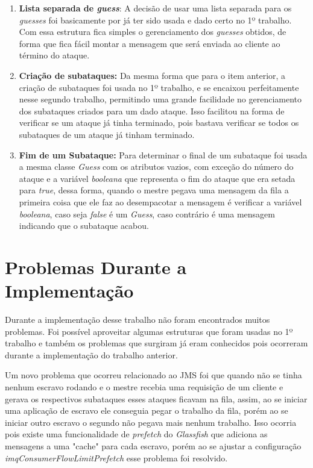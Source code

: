 \documentclass[
	12pt,				%
    oneside,			%
	a4paper,			%
	english,			%
	brazil,				%
	]{abntex2}
\begin{document}
\begin{enumerate}

	\item \textbf{Lista separada de \textit{guess}}: A decisão de usar uma lista separada para os \textit{guesses} foi 
	basicamente por já ter sido usada e dado certo no 1º trabalho. Com essa estrutura fica simples o gerenciamento dos 
	\textit{guesses} obtidos, de forma que fica fácil montar a mensagem que será enviada ao cliente ao término do ataque.
	
	\item \textbf{Criação de subataques:} Da mesma forma que para o item anterior, a criação de subataques foi usada no 1º 	
	trabalho, e se encaixou perfeitamente nesse segundo trabalho, permitindo uma grande facilidade no gerenciamento dos 
	subataques criados para um dado ataque. Isso facilitou na forma de verificar se um ataque já tinha terminado, pois 
	bastava verificar se todos os subataques de um ataque já tinham terminado.
		
	\item \textbf{Fim de um Subataque:}  Para determinar o final de um subataque foi usada a mesma classe \textit{Guess}
	com os atributos vazios, com exceção do número do ataque e a variável \textit{booleana} que representa o fim do ataque 		que era setada para \textit{true}, dessa forma, quando o mestre pegava uma mensagem da fila a primeira coisa que ele faz 
	ao desempacotar a mensagem é verificar a variável \textit{booleana}, caso seja \textit{false} é um \textit{Guess}, 
	caso contrário é uma mensagem indicando que o subataque acabou.
	
\end{enumerate}

\section{Problemas Durante a Implementação}
Durante a implementação desse trabalho não foram encontrados muitos problemas. Foi possível aproveitar algumas estruturas que foram usadas no 1º trabalho e também os problemas que surgiram já eram conhecidos pois ocorreram durante a implementação do trabalho anterior.

Um novo problema que ocorreu relacionado ao JMS foi que quando não se tinha nenhum escravo rodando e o mestre recebia uma requisição de um cliente e gerava os respectivos subataques esses ataques ficavam na fila, assim, ao se iniciar uma aplicação de escravo ele conseguia pegar o trabalho da fila, porém ao se iniciar outro escravo o segundo não pegava mais nenhum trabalho. Isso ocorria pois existe uma funcionalidade de \textit{prefetch} do \textit{Glassfish} que adiciona as mensagens a uma "cache" para cada escravo, porém ao se ajustar a configuração \textit{imqConsumerFlowLimitPrefetch} esse problema foi resolvido.
\end{document}
